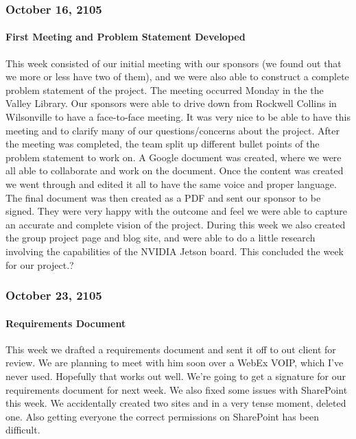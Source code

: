 \subsubsection{October 16, 2105}
\paragraph{First Meeting and Problem Statement Developed}
This week consisted of our initial meeting with our sponsors (we found out that we more or less have two of them), and we were also able to construct a complete problem statement of the project. The meeting occurred Monday in the the Valley Library. Our sponsors were able to drive down from Rockwell Collins in Wilsonville to have a face-to-face meeting. It was very nice to be able to have this meeting and to clarify many of our questions/concerns about the project. After the meeting was completed, the team split up different bullet points of the problem statement to work on. A Google document was created, where we were all able to collaborate and work on the document. Once the content was created we went through and edited it all to have the same voice and proper language. The final document was then created as a PDF and sent our sponsor to be signed. They were very happy with the outcome and feel we were able to capture an accurate and complete vision of the project. During this week we also created the group project page and blog site, and were able to do a little research involving the capabilities of the NVIDIA Jetson board. This concluded the week for our project.?\\

\subsubsection{October 23, 2105}
\paragraph{Requirements Document}
This week we drafted a requirements document and sent it off to out client for review. We are planning to meet with him soon over a WebEx VOIP, which I've never used. Hopefully that works out well. We're going to get a signature for our requirements document for next week. We also fixed some issues with SharePoint this week. We accidentally created two sites and in a very tense moment, deleted one. Also getting everyone the correct permissions on SharePoint has been difficult.\\

